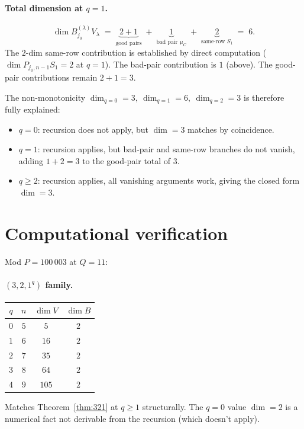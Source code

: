 \documentclass[11pt]{article}
\theoremstyle{definition}
\begin{document}
\paragraph{Total dimension at $q = 1$.}
\[
   \dim B^{(\lambda)}_{j_0} V_\lambda
   \;=\; \underbrace{2 + 1}_{\text{good pairs}}
   \;+\; \underbrace{1}_{\text{bad pair }\mu_C}
   \;+\; \underbrace{2}_{\text{same-row }S_1}
   \;=\; 6.
\]
The $2$-dim same-row contribution is established by direct computation
($\dim P_{j_0, n-1} S_1 = 2$ at $q = 1$). The bad-pair contribution
is $1$ (above). The good-pair contributions remain $2 + 1 = 3$.

The non-monotonicity $\dim_{q=0} = 3,\ \dim_{q=1} = 6,\ \dim_{q=2} = 3$
is therefore fully explained:
\begin{itemize}[topsep=0.2em,itemsep=0.1em]
\item $q = 0$: recursion does not apply, but $\dim = 3$ matches by
coincidence.
\item $q = 1$: recursion applies, but bad-pair and same-row branches
do not vanish, adding $1 + 2 = 3$ to the good-pair total of $3$.
\item $q \ge 2$: recursion applies, all vanishing arguments work,
giving the closed form $\dim = 3$.
\end{itemize}

\section{Computational verification}\label{sec:verify}

Mod $P = 100\,003$ at $Q = 11$:

\paragraph{$(3, 2, 1^q)$ family.}
\begin{center}
\begin{tabular}{cccc}
\toprule
$q$ & $n$ & $\dim V$ & $\dim B$ \\
\midrule
$0$ & $5$  & $5$    & $2$ \\
$1$ & $6$  & $16$   & $2$ \\
$2$ & $7$  & $35$   & $2$ \\
$3$ & $8$  & $64$   & $2$ \\
$4$ & $9$  & $105$  & $2$ \\
\bottomrule
\end{tabular}
\end{center}
Matches Theorem~\ref{thm:321} at $q \ge 1$ structurally. The $q = 0$
value $\dim = 2$ is a numerical fact not derivable from the
recursion (which doesn't apply).
\end{document}
